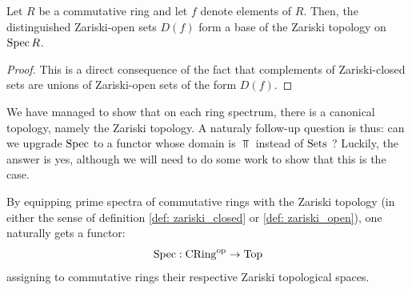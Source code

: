             \begin{corollary} \label{coro: zariski_basis}
                Let $R$ be a commutative ring and let $f$ denote elements of $R$. Then, the distinguished Zariski-open sets $D(f)$ form a base of the Zariski topology on $\operatorname{Spec} R$.
            \end{corollary}
                \begin{proof}
                    This is a direct consequence of the fact that complements of Zariski-closed sets are unions of Zariski-open sets of the form $D(f)$.
                \end{proof}
            
            We have managed to show that on each ring spectrum, there is a canonical topology, namely the Zariski topology. A naturaly follow-up question is thus: can we upgrade $\operatorname{Spec}$ to a functor whose domain is $\Top$ instead of $\mathrm{Sets}$ ? Luckily, the answer is yes, although we will need to do some work to show that this is the case. 
            \begin{proposition} \label{prop: continuous_functions_between_spectra}
                By equipping prime spectra of commutative rings with the Zariski topology (in either the sense of definition \ref{def: zariski_closed} or \ref{def: zariski_open}), one naturally gets a functor:
                    $$\operatorname{Spec}: \mathrm{CRing}^{\mathrm{op}} \to \mathrm{Top}$$
                assigning to commutative rings their respective Zariski topological spaces.
            \end{proposition}
